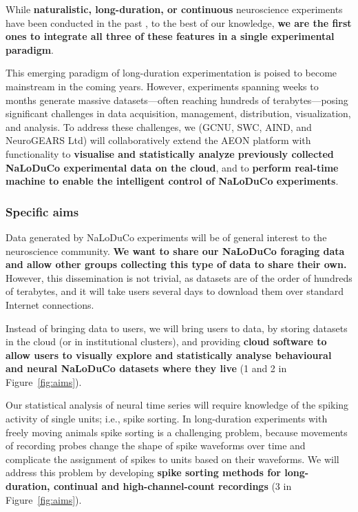 
While \textbf{naturalistic, long-duration, or continuous} neuroscience experiments have
been conducted in the past
\citep{nagyEtAl23,hoEtAl23,rayEtAl25,weissbrodEtAl13,dhawaleEtAl17,newmanEtAl24}, to the
best of our knowledge, \textbf{we are the first ones to integrate all three of these
features in a single experimental paradigm}.
%

This emerging paradigm of long-duration experimentation is poised to become
mainstream in the coming years.
%
However, experiments spanning weeks to months generate massive datasets—often
reaching hundreds of terabytes—posing significant challenges in data
acquisition, management, distribution, visualization, and analysis.
%
To address these challenges, we (GCNU, SWC, AIND, and NeuroGEARS Ltd) will
collaboratively extend the AEON platform with functionality to
\textbf{visualise and statistically analyze previously collected NaLoDuCo
experimental data on the cloud}, and to \textbf{perform real-time machine to enable the
intelligent control of NaLoDuCo experiments}.

\subsubsection{Specific aims}

Data generated by NaLoDuCo experiments will be of general interest to the
neuroscience community. \textbf{We want to share our NaLoDuCo foraging data and
allow other groups collecting this type of data to share their own.}
%
However, this dissemination is not trivial, as datasets are of the order of
hundreds of terabytes, and it will take users several days to download them
over standard Internet connections.

Instead of bringing data to users, we will bring users to data, by storing
datasets in the cloud (or in institutional clusters), and providing
\textbf{cloud software to allow users to visually explore and statistically
analyse behavioural and neural NaLoDuCo datasets where they live}
(1 and 2 in Figure~\ref{fig:aims}).

Our statistical analysis of neural time series will require knowledge of the
spiking activity of single units; i.e., spike sorting. In long-duration
experiments with freely moving animals spike sorting is a challenging problem,
because movements of recording probes change the shape of spike waveforms over
time and complicate the assignment of spikes to units based on their waveforms.
We will address this problem by developing \textbf{spike sorting methods for
long-duration, continual and high-channel-count recordings} (3 in
Figure~\ref{fig:aims}).

